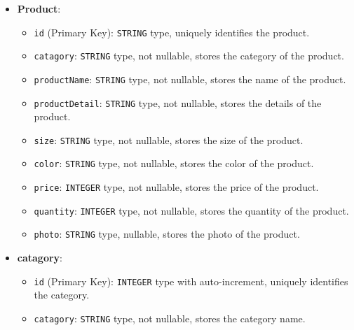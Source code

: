 \begin{itemize}
    \item \textbf{Product}:
    \begin{itemize}
        \item \texttt{id} (Primary Key): \texttt{STRING} type, uniquely identifies the product.
        \item \texttt{catagory}: \texttt{STRING} type, not nullable, stores the category of the product.
        \item \texttt{productName}: \texttt{STRING} type, not nullable, stores the name of the product.
        \item \texttt{productDetail}: \texttt{STRING} type, not nullable, stores the details of the product.
        \item \texttt{size}: \texttt{STRING} type, not nullable, stores the size of the product.
        \item \texttt{color}: \texttt{STRING} type, not nullable, stores the color of the product.
        \item \texttt{price}: \texttt{INTEGER} type, not nullable, stores the price of the product.
        \item \texttt{quantity}: \texttt{INTEGER} type, not nullable, stores the quantity of the product.
        \item \texttt{photo}: \texttt{STRING} type, nullable, stores the photo of the product.
    \end{itemize}
    
    \item \textbf{catagory}:
    \begin{itemize}
        \item \texttt{id} (Primary Key): \texttt{INTEGER} type with auto-increment, uniquely identifies the category.
        \item \texttt{catagory}: \texttt{STRING} type, not nullable, stores the category name.
    \end{itemize}
\end{itemize}

